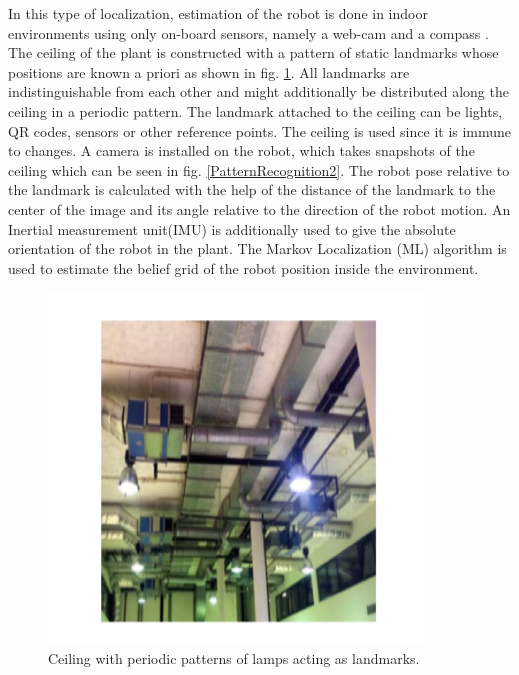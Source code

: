 In this type of localization, estimation of the robot is done in indoor environments using
only on-board sensors, namely a web-cam and a compass \cite{pat_recog}. The ceiling of the plant is constructed with a pattern of static landmarks whose positions are known a priori as shown in fig. \ref{Pattern Recognition}. All landmarks are indistinguishable from each other and might additionally be distributed along the ceiling in a periodic pattern. The landmark attached to the ceiling can be lights, QR codes, sensors or other reference points. The ceiling is used since it is immune to changes. A camera is installed on the robot, which takes snapshots of the ceiling which can be seen in fig. \ref{PatternRecognition2}. The robot pose relative to the landmark is calculated with the help of the distance of the landmark to the center of the image and its angle relative to the direction of the robot motion. An Inertial measurement unit(IMU) is additionally used to give the absolute orientation of the robot in the plant. The Markov Localization (ML) algorithm is used to estimate
the belief grid of the robot position inside the environment. 

\begin{figure}[!htbp]
	\centering
	\includegraphics[width = 10cm]{Pictures/PR.png}
	\caption{Ceiling with periodic patterns of lamps acting as landmarks. }
	\label{Pattern Recognition}
\end{figure}
